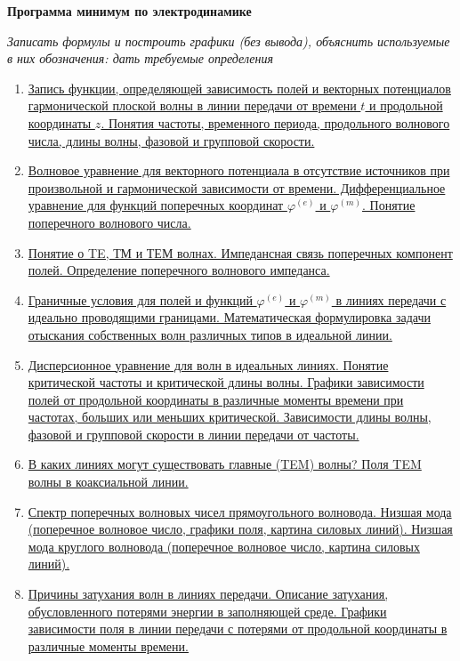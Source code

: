\documentclass[a4paper,14pt]{extarticle}
\renewcommand{\phi}{\varphi}
\begin{document}
	\begin{center}
		\Large \textbf{Программа минимум по электродинамике}
	\end{center}
		\textit{Записать формулы и построить графики (без вывода), объяснить используемые в них обозначения: дать требуемые определения}
	\begin{enumerate}
		\item 
		\hyperlink{num1}{Запись функции, определяющей зависимость полей и векторных потенциалов гармонической плоской волны в линии передачи от времени $t$ и продольной координаты $z$. Понятия частоты, временного периода, продольного волнового числа, длины волны, фазовой и групповой скорости.}
		
		\item 
		\hyperlink{num2}{Волновое уравнение для векторного потенциала в отсутствие источников при произвольной и гармонической зависимости от времени. Дифференциальное уравнение для функций поперечных координат $\phi^{(e)}$ и $\phi^{(m)}$. Понятие поперечного волнового числа.}
		\item 
		\hyperlink{num3}{Понятие о TE, ТМ и ТЕМ волнах. Импедансная связь поперечных компонент полей. Определение поперечного волнового импеданса.}
		\item
		\hyperlink{num4}{Граничные условия для полей и функций  $\phi^{(e)}$ и $\phi^{(m)}$ в линиях передачи с идеально 
		проводящими границами. Математическая формулировка задачи отыскания собственных волн различных типов в идеальной линии.}
		\item 
		\hyperlink{num5}{Дисперсионное уравнение для волн в идеальных линиях. Понятие критической частоты и критической длины волны. Графики зависимости полей от продольной координаты в различные моменты времени при частотах, больших или меньших критической. Зависимости длины волны, фазовой и групповой скорости в линии передачи от частоты.}
		\item
		\hyperlink{num6}{В каких линиях могут существовать главные (TEM) волны? Поля TEM волны в	коаксиальной линии.}
		\item 
		\hyperlink{num7}{Спектр поперечных волновых чисел прямоугольного волновода. Низшая мода (поперечное волновое число, графики поля, картина силовых линий). Низшая мода круглого волновода (поперечное волновое число, картина силовых линий).}
		\item
		\hyperlink{num8}{Причины затухания волн в линиях передачи. Описание затухания, обусловленного потерями энергии в заполняющей среде. Графики зависимости поля в линии передачи с потерями от продольной координаты в различные моменты времени.}

\end{enumerate}
\end{document}

